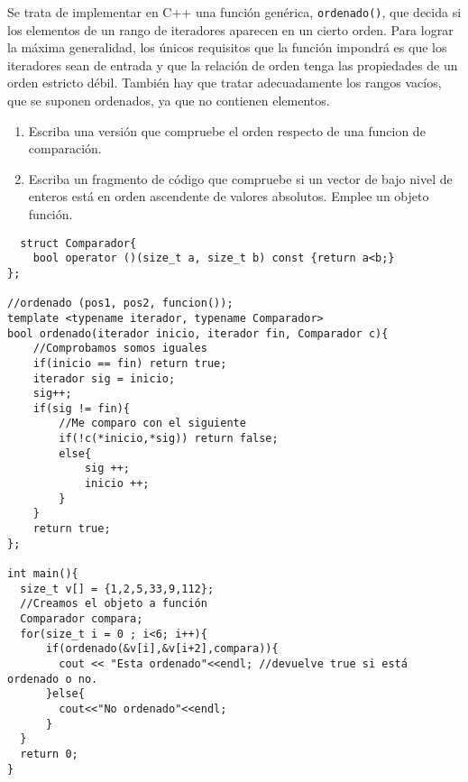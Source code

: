  Se trata de implementar en C++ una función genérica, \texttt{ordenado()}, que decida si los elementos de un rango de iteradores aparecen en un cierto orden. Para lograr la máxima generalidad, los únicos requisitos que la función impondrá es que los iteradores sean de entrada y que la relación de orden tenga las propiedades de un orden estricto débil. También hay que tratar adecuadamente los rangos vacíos, que se suponen ordenados, ya que no contienen elementos.

\begin{enumerate}[label = \alph*)]
  \item Escriba una versión que compruebe el orden respecto de una funcion de comparación.
  \item Escriba un fragmento de código que compruebe si un vector de bajo nivel de enteros está en orden ascendente de valores absolutos. Emplee un objeto función.
\end{enumerate}
\begin{verbatim}
  struct Comparador{
    bool operator ()(size_t a, size_t b) const {return a<b;}
};

//ordenado (pos1, pos2, funcion());
template <typename iterador, typename Comparador>
bool ordenado(iterador inicio, iterador fin, Comparador c){
    //Comprobamos somos iguales
    if(inicio == fin) return true;
    iterador sig = inicio;
    sig++;
    if(sig != fin){
        //Me comparo con el siguiente
        if(!c(*inicio,*sig)) return false;
        else{
            sig ++;
            inicio ++;
        }
    }
    return true;
};

int main(){
  size_t v[] = {1,2,5,33,9,112};
  //Creamos el objeto a función
  Comparador compara;
  for(size_t i = 0 ; i<6; i++){
      if(ordenado(&v[i],&v[i+2],compara)){
        cout << "Esta ordenado"<<endl; //devuelve true si está ordenado o no.
      }else{
        cout<<"No ordenado"<<endl;
      }
  }
  return 0;
}
\end{verbatim}